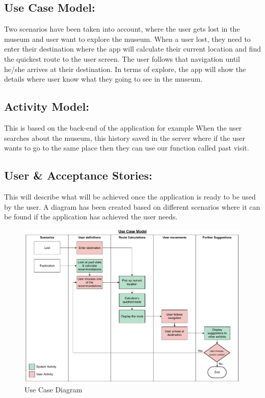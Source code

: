 \subsection{Use Case Model:}
Two scenarios have been taken into account, where the user gets lost in the museum and user want to explore the museum. When a user lost, they need to enter their destination where the app will calculate their current location and find the quickest route to the user screen. The user follows that navigation until he/she arrives at their destination. In terms of explore, the app will show the details where user know what they going to see in the museum.

\subsection{Activity Model:}
This is based on the back-end of the application for example When the user searches about the museum, this history saved in the server where if the user wants to go to the same place then they can use our function called past visit.

\subsection{User & Acceptance Stories:}
This will describe what will be achieved once the application is ready to be used by the user. A diagram has been created based on different scenarios where it can be found if the application has achieved the user needs. 

\begin{figure}[H]
    \centering
    \includegraphics[width=\textwidth]
    {assets/use_case.pdf}
    \caption{Use Case Diagram}
    \label{fig:Use Case Diagram}
\end{figure}

